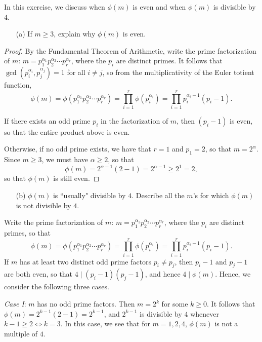 \documentclass{article}
\begin{document}
\begin{exercise}[Chapter 11, \#2]
In this exercise, we discuss when $\phi(m)$ is even and when $\phi(m)$ is divisible by $4$.

\begin{itemize}
    \item[(a)] If $m\geq 3$, explain why $\phi(m)$ is even.
\end{itemize}
\begin{proof}
By the Fundamental Theorem of Arithmetic, write the prime factorization of $m$: $m = p_1^{\alpha_1} p_2^{\alpha_2}\cdots p_r^{\alpha_r}$, where the $p_i$ are distinct primes. It follows that $\gcd(p_i^{\alpha_i}, p_j^{\alpha_j}) = 1$ for all $i\neq j$, so from the multiplicativity of the Euler totient function,
$$\phi(m) = \phi(p_1^{\alpha_1}p_2^{\alpha_2} \cdots p_r^{\alpha_r}) = \prod_{i=1}^r \phi(p_i^{\alpha_i}) = \prod_{i=1}^r p_i^{\alpha_i-1}(p_i-1).$$

If there exists an odd prime $p_i$ in the factorization of $m$, then $(p_i-1)$ is even, so that the entire product above is even. 

Otherwise, if no odd prime exists, we have that $r=1$ and $p_1 = 2$, so that $m = 2^\alpha$. Since $m\geq 3$, we must have $\alpha \geq 2$, so that $$\phi(m) = 2^{\alpha-1}(2-1) = 2^{\alpha-1} \geq 2^1 = 2,$$ so that $\phi(m)$ is still even.
\end{proof}
\begin{itemize}
    \item[(b)] $\phi(m)$ is ``usually" divisible by $4$. Describe all the $m$'s for which $\phi(m)$ is not divisible by $4$.
\end{itemize}
\begin{solution}
Write the prime factorization of $m$: $m = p_1^{\alpha_1} p_2^{\alpha_2}\cdots p_r^{\alpha_r}$, where the $p_i$ are distinct primes, so that
$$\phi(m) = \phi(p_1^{\alpha_1}p_2^{\alpha_2} \cdots p_r^{\alpha_r}) = \prod_{i=1}^r \phi(p_i^{\alpha_i}) = \prod_{i=1}^r p_i^{\alpha_i-1}(p_i-1).$$
If $m$ has at least two distinct odd prime factors $p_i\neq p_j$, then $p_i-1$ and $p_j-1$ are both even, so that $4\mid (p_i-1)(p_j-1)$, and hence $4\mid \phi(m)$. Hence, we consider the following three cases.

\textit{Case I}: $m$ has no odd prime factors. Then $m = 2^k$ for some $k\geq 0$. It follows that $\phi(m) = 2^{k-1}(2-1) = 2^{k-1}$, and $2^{k-1}$ is divisible by $4$ whenever $k-1\geq 2 \iff k=3$. In this case, we see that for $m = 1,2, 4$, $\phi(m)$ is not a multiple of $4$.


\end{solution}
\end{exercise}
\end{document}
